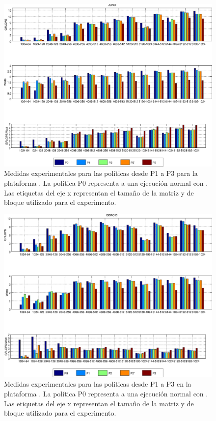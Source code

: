 \begin{figure}
  \centering
  \setlength{\fboxsep}{-20pt}
  \includegraphics[width=1.0\textwidth]{Plots/dvfs_results/0-4_all_juno.eps}
  
  \caption[Medidas experimentales para las políticas desde P1 a P3 en \juno]{Medidas
    experimentales para las políticas desde P1 a P3 para la plataforma \juno. La política P0
    representa a una ejecución normal con \botlev. Las etiquetas del eje x
    representan el tamaño de la matriz y de bloque utilizado para el experimento.}
  \label{fig:resultados:all-0-3:juno}
\end{figure}

\begin{figure}
  \centering
  \includegraphics[width=1.0\textwidth]{Plots/dvfs_results/0-4_all_odroid.eps}
  \caption[Medidas experimentales para las políticas desde P1 a P3 en \odroid]{Medidas
    experimentales para las políticas desde P1 a P3 en la plataforma \odroid. La política P0
    representa a una ejecución normal con \botlev. Las etiquetas del eje x
    representan el tamaño de la matriz y de bloque utilizado para el experimento.}
  \label{fig:resultados:all-0-3:odroid}
\end{figure}

